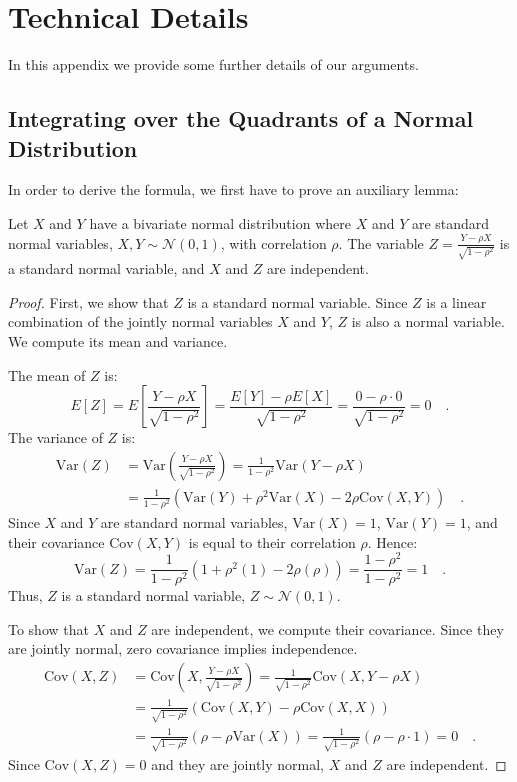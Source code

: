 \documentclass[../../main.tex]{subfiles}
\begin{document}
\section{Technical Details}
\label{section:technical_details}
In this appendix we provide some further details of our arguments.

\subsection{Integrating over the Quadrants of a Normal Distribution}
\label{section:integrating_quadrants}
In order to derive the formula, we first have to prove an auxiliary lemma:

\begin{lemma}
Let $X$ and $Y$ have a bivariate normal distribution where $X$ and $Y$ are standard normal variables, $X, Y \sim \mathcal{N}(0,1)$, with correlation $\rho$. The variable $Z = \frac{Y-\rho X}{\sqrt{1-\rho^2}}$ is a standard normal variable, and $X$ and $Z$ are independent.
\end{lemma}

\begin{proof}
First, we show that $Z$ is a standard normal variable. Since $Z$ is a linear combination of the jointly normal variables $X$ and $Y$, $Z$ is also a normal variable. We compute its mean and variance.

The mean of $Z$ is:
$$ E[Z] = E\left[\frac{Y-\rho X}{\sqrt{1-\rho^2}}\right] = \frac{E[Y]-\rho E[X]}{\sqrt{1-\rho^2}} = \frac{0 - \rho \cdot 0}{\sqrt{1-\rho^2}} = 0 \quad .$$
The variance of $Z$ is:
\begin{align*}
    \text{Var}(Z) &= \text{Var}\left(\frac{Y-\rho X}{\sqrt{1-\rho^2}}\right) = \frac{1}{1-\rho^2}\text{Var}(Y-\rho X) \\
    &= \frac{1}{1-\rho^2}\left(\text{Var}(Y) + \rho^2\text{Var}(X) - 2\rho\text{Cov}(X,Y)\right) \quad .
\end{align*}
Since $X$ and $Y$ are standard normal variables, $\text{Var}(X) = 1$, $\text{Var}(Y) = 1$, and their covariance $\text{Cov}(X,Y)$ is equal to their correlation $\rho$. Hence:
$$ \text{Var}(Z) = \frac{1}{1-\rho^2}(1 + \rho^2(1) - 2\rho(\rho)) = \frac{1-\rho^2}{1-\rho^2} = 1 \quad . $$
Thus, $Z$ is a standard normal variable, $Z \sim \mathcal{N}(0,1)$.

To show that $X$ and $Z$ are independent, we compute their covariance. Since they are jointly normal, zero covariance implies independence.
\begin{align*}
    \text{Cov}(X,Z) &= \text{Cov}\left(X, \frac{Y-\rho X}{\sqrt{1-\rho^2}}\right) = \frac{1}{\sqrt{1-\rho^2}}\text{Cov}(X, Y-\rho X) \\
    &= \frac{1}{\sqrt{1-\rho^2}}\left(\text{Cov}(X,Y) - \rho\text{Cov}(X,X)\right) \\
    &= \frac{1}{\sqrt{1-\rho^2}}\left(\rho - \rho\text{Var}(X)\right) = \frac{1}{\sqrt{1-\rho^2}}(\rho - \rho \cdot 1) = 0 \quad .
\end{align*}
Since $\text{Cov}(X,Z)=0$ and they are jointly normal, $X$ and $Z$ are independent.
\end{proof}
\end{document}
